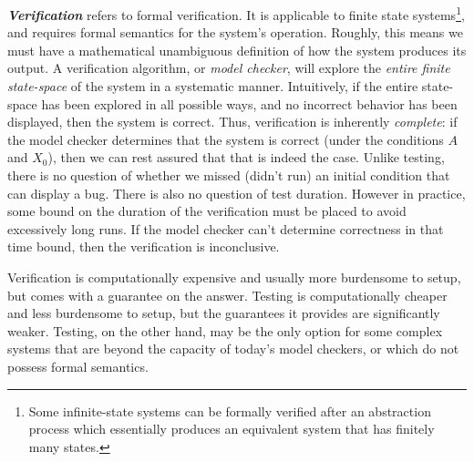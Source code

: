 \emph{\textbf{Verification}} refers to formal verification.
It is applicable to finite state systems\footnote{Some infinite-state systems can be formally verified after an abstraction process which essentially produces an equivalent system that has finitely many states.}, 
and requires formal semantics for the system's operation. 
Roughly, this means we must have a mathematical unambiguous definition of how the system produces its output.
A verification algorithm, or \emph{model checker}, will explore the \emph{entire finite state-space} of the system in a systematic manner. 
Intuitively, if the entire state-space has been explored in all possible ways, and no incorrect behavior has been displayed, then the system is correct. 
Thus, verification is inherently \emph{complete}: if the model checker determines that the system is correct (under the conditions $A$ and $X_0$), then we can rest assured that that is indeed the case.
Unlike testing, there is no question of whether we missed (didn't run) an initial condition that can display a bug.
There is also no question of test duration.
However in practice, some bound on the duration of the verification must be placed to avoid excessively long runs. 
If the model checker can't determine correctness in that time bound, then the verification is inconclusive.

Verification is computationally expensive and usually more burdensome to setup, but comes with a guarantee on the answer. 
Testing is computationally cheaper and less burdensome to setup, but the guarantees it provides are significantly weaker.
Testing, on the other hand, may be the only option for some complex systems that are beyond the capacity of today's model checkers, or which do not possess formal semantics.







